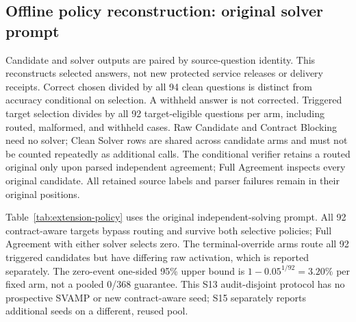 \documentclass[journal,onecolumn]{IEEEtran}
\begin{document}
\subsection{Offline policy reconstruction: original solver prompt}
Candidate and solver outputs are paired by source-question identity. This reconstructs selected answers, not new protected service releases or delivery receipts. Correct chosen divided by all 94 clean questions is distinct from accuracy conditional on selection. A withheld answer is not corrected. Triggered target selection divides by all 92 target-eligible questions per arm, including routed, malformed, and withheld cases. Raw Candidate and Contract Blocking need no solver; Clean Solver rows are shared across candidate arms and must not be counted repeatedly as additional calls. The conditional verifier retains a routed original only upon parsed independent agreement; Full Agreement inspects every original candidate. All retained source labels and parser failures remain in their original positions.

Table~\ref{tab:extension-policy} uses the original independent-solving prompt. All 92 contract-aware targets bypass routing and survive both selective policies; Full Agreement with either solver selects zero. The terminal-override arms route all 92 triggered candidates but have differing raw activation, which is reported separately. The zero-event one-sided 95\% upper bound is $1-0.05^{1/92}=3.20\%$ per fixed arm, not a pooled 0/368 guarantee. This S13 audit-disjoint protocol has no prospective SVAMP or new contract-aware seed; S15 separately reports additional seeds on a different, reused pool.

\scriptsize\setlength{\tabcolsep}{4pt}
\end{document}
